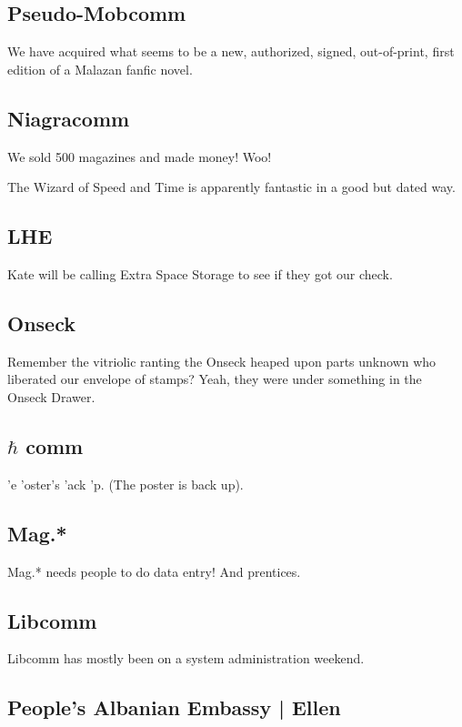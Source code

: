 \documentclass[10pt]{article}
\begin{document}
\subsection*{Pseudo-Mobcomm}

We have acquired what seems to be a new, authorized, signed, out-of-print, first edition of a Malazan fanfic novel.

\subsection*{Niagracomm}

We sold 500 magazines and made money!  Woo!

The Wizard of Speed and Time is apparently fantastic in a good but dated way.

\subsection*{LHE}

Kate will be calling Extra Space Storage to see if they got our check.

\subsection*{Onseck}

Remember the vitriolic ranting the Onseck heaped upon parts unknown who liberated our envelope of stamps?  Yeah, they were under something in the Onseck Drawer.

\subsection*{$\hbar$ comm}

'e 'oster's 'ack 'p.  (The poster is back up).

\subsection*{Mag.*}

Mag.* needs people to do data entry!  And prentices.

\subsection*{Libcomm}

Libcomm has mostly been on a system administration weekend.

\subsection*{People's Albanian Embassy | Ellen}
\end{document}
